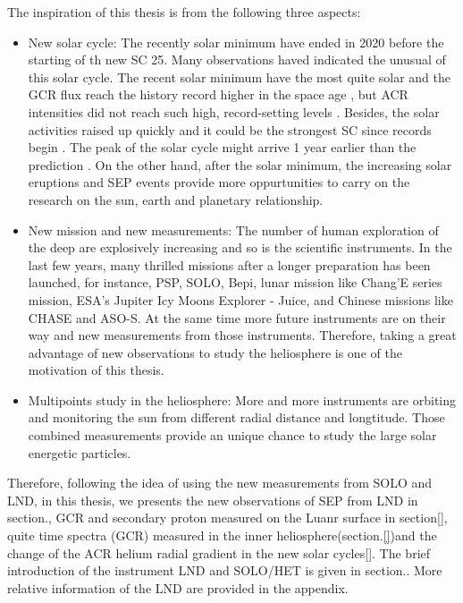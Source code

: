 The inspiration of this thesis is from the following three aspects:
\begin{itemize}
	\item New solar cycle: The recently solar minimum have ended in 2020 before the starting of th new \ac{SC} 25. Many observations haved indicated the unusual of this solar cycle. The recent solar minimum have the most quite solar and the \ac{GCR} flux reach the history record higher in the space age \citep{Fu2022, Xu2022FrASS}, but ACR intensities did not reach such high, record-setting levels \citet{Strauss2023ApJ}. Besides, the solar activities raised up quickly and it could be the strongest \ac{SC} since records begin \citet{Nagovitsyn2023SoPh}. The peak of the solar cycle might arrive 1 year earlier than the prediction \citet{McIntosh2020SoPh}. On the other hand, after the solar minimum, the increasing solar eruptions  and \ac{SEP} events provide more oppurtunities to carry on the research on the sun, earth and planetary relationship.
	\item New mission and new measurements: The number of human exploration of the deep are explosively increasing and so is the scientific instruments. In the last few years, many thrilled missions after a longer preparation has been launched, for instance, \ac{PSP}, \ac{SOLO}, \ac{Bepi}, lunar mission like Chang'E series mission, ESA's Jupiter Icy Moons Explorer - Juice, and Chinese missions like CHASE and ASO-S. At the same time more future instruments are on their way and new measurements from those instruments. Therefore, taking a great advantage of new observations to study the heliosphere is one of the motivation of this thesis. 
	\item Multipoints study in the heliosphere: More and more instruments are orbiting and monitoring the sun from different radial distance and longtitude. Those combined measurements provide an unique chance to study the large solar energetic particles.
\end{itemize}

Therefore, following the idea of using the new measurements from SOLO and LND, in this thesis, we presents the new observations of \ac{SEP} from \ac{LND} in section.{}, \ac{GCR} and secondary proton measured on the Luanr surface in section\ref{}, quite time spectra (\ac{GCR}) measured in the inner heliosphere(section.\ref{})and the change of the \ac{ACR} helium radial gradient in the new solar cycles\ref{}.
The brief introduction of the instrument \ac{LND} and \ac{SOLO}/\ac{HET} is given in section.\re{}. 
More relative information of the \ac{LND} are provided in the appendix.


